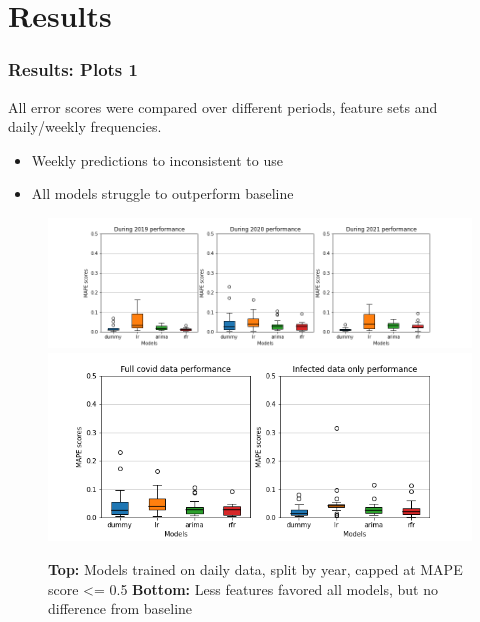 \documentclass[aspectratio=169,classic]{uva-inf-presentation}
\begin{document}
\section{Results}
\begin{frame}
\frametitle{Results: Plots 1}
All error scores were compared over different periods, feature sets and daily/weekly frequencies.
\begin{itemize}
    \item Weekly predictions to inconsistent to use
    \item All models struggle to outperform baseline
\end{itemize}
\begin{figure}\centering
    \includegraphics[trim=0cm 0.5cm 0 -6cm, scale=0.25]{images/daily_2019_vs_2020_vs_2021_max_05.png}
    \includegraphics[trim=0cm 0.5cm 0 0cm, scale=0.25]{images/daily_full_covid_data_vs_infected_data_only_max_05.png}
    \caption{\textbf{Top:} Models trained on daily data, split by year, capped at MAPE score <= 0.5 \newline\textbf{Bottom:} Less features favored all models, but no difference from baseline}
\end{figure}
\end{frame}
\end{document}
